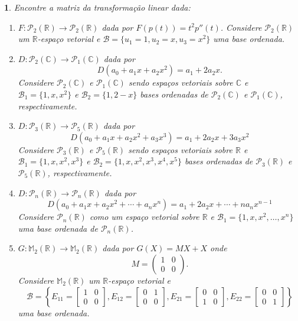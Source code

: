 \documentclass[12pt]{exam}
\newtheorem{exercicio}{}
\newcommand{\real}{\mathbb{R}}
\newcommand{\complex}{\mathbb{C}}
\newcommand{\cp}[1]{\mathbb{#1}}
\begin{document}
\begin{exercicio}
  Encontre a matriz da transformação linear dada:
  \begin{enumerate}[label=({\alph*})]
    \item $F : \mathcal{P}_2(\real) \to \mathcal{P}_2(\real)$ dada por $F(p(t)) = t^2p''(t)$. Considere $\mathcal{P}_2(\real)$ um $\real$-espa\c{c}o vetorial e $\mathcal{B} = \{u_1 = 1, u_2 = x, u_3 = x^2\}$ uma base ordenada.
    
    \item $D : \mathcal{P}_2(\complex) \to \mathcal{P}_1(\complex)$ dada por
    \[
      D(a_0 + a_1x + a_2x^2) = a_1 + 2a_2x.
    \]
    Considere $\mathcal{P}_2(\complex)$ e $\mathcal{P}_1(\complex)$ sendo espa\c{c}os vetoriais sobre $\complex$ e $\mathcal{B}_1 = \{1, x, x^2\}$ e $\mathcal{B}_2 = \{1, 2 - x\}$ bases ordenadas de $\mathcal{P}_2(\complex)$ e $\mathcal{P}_1(\complex)$, respectivamente.
    
    \item $D : \mathcal{P}_3(\real) \to \mathcal{P}_5(\real)$ dada por
    \[
      D(a_0 + a_1x + a_2x^2 + a_3x^3) = a_1 + 2a_2x + 3a_3x^2
    \]
    Considere $\mathcal{P}_3(\real)$ e $\mathcal{P}_5(\real)$ sendo espa\c{c}os vetoriais sobre $\real$ e $\mathcal{B}_1 = \{1, x, x^2, x^3\}$ e $\mathcal{B}_2 = \{1, x, x^2, x^3, x^4, x^5\}$ bases ordenadas de $\mathcal{P}_3(\real)$ e $\mathcal{P}_5(\real)$, respectivamente.

    \item $D : \mathcal{P}_n(\real) \to \mathcal{P}_n(\real)$ dada por
    \[
      D(a_0 + a_1x + a_2x^2 + \cdots + a_nx^n) = a_1 + 2a_2x + \cdots + na_nx^{n-1}
    \]
    Considere $\mathcal{P}_n(\real)$ como um espa\c{c}o vetorial sobre $\real$ e $\mathcal{B}_1 = \{1, x, x^2, \dots, x^n\}$ uma base ordenada de $\mathcal{P}_n(\real)$.

    \item $G : \cp{M}_2(\real) \to \cp{M}_2(\real)$ dada por $G(X) = MX + X$ onde
    \[
      M = \begin{pmatrix}
        1 & 0\\
        0 & 0
      \end{pmatrix}.
    \]
    Considere $\cp{M}_2(\real)$ um $\real$-espa\c{c}o vetorial e
    \[
        \mathcal{B} = \left\{E_{11} = \begin{bmatrix}
          1 & 0\\0 & 0
        \end{bmatrix}, E_{12} = \begin{bmatrix}
          0 & 1\\0 & 0
        \end{bmatrix}, E_{21} = \begin{bmatrix}
          0 & 0\\1 & 0
        \end{bmatrix}, E_{22} = \begin{bmatrix}
          0 & 0\\0 & 1
        \end{bmatrix}\right\}
    \]
    uma base ordenada.


\end{enumerate}
\end{exercicio}
\end{document}
